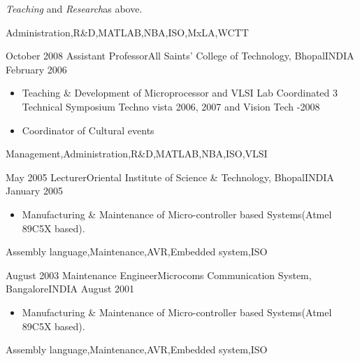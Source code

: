 \begin{experiences}
{\begin{itemize}
                      \end{itemize}
                  \textit{Teaching} and \textit{Research}as above.
                    }
                    {Administration,R\&D,MATLAB,NBA,ISO,MxLA,WCTT}

  \emptySeparator
 
  
  \experience
  {October 2008}  {Assistant Professor}{All Saints' College of Technology, Bhopal}{INDIA}
  {February 2006}   {
                      
                      \begin{itemize}
                       \item Teaching \& Development of Microprocessor and VLSI Lab
                       Coordinated 3 Technical Symposium Techno vista 2006, 2007 and Vision Tech -2008
                       \item Coordinator of Cultural events
                        
                      \end{itemize}
                  }
                  {Management,Administration,R\&D,MATLAB,NBA,ISO,VLSI} 
 \emptySeparator
 
 
 \experience
 {May 2005}  {Lecturer}{Oriental Institute of Science \& Technology, Bhopal}{INDIA}
 {January 2005}   {
 	
 	\begin{itemize}
 		\item Manufacturing \& Maintenance of Micro-controller based Systems(Atmel 89C5X based).
 		
 		
 	\end{itemize}
 }
 {Assembly language,Maintenance,AVR,Embedded system,ISO} 
                  
 \emptySeparator


\experience
{August 2003}  {Maintenance Engineer}{Microcoms Communication System, Bangalore}{INDIA}
{August 2001}   {
	
	\begin{itemize}
		\item Manufacturing \& Maintenance of Micro-controller based Systems(Atmel 89C5X based).
		
		
	\end{itemize}
}
{Assembly language,Maintenance,AVR,Embedded system,ISO} 
\end{experiences}
